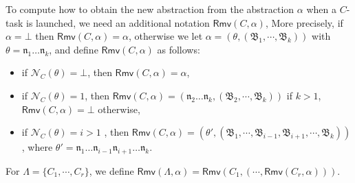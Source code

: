 \documentclass[preprint,12pt]{elsarticle}
\newcommand\act{{\sf Act}}
\newcommand\namefun{\mathcal{N}}
\newcommand\aname{\mathfrak{n}}
\newcommand{\STK}{\mathsf{STK}}
\newcommand{\SIT}{\mathsf{SIT}}
\newcommand\AutB{{\mathfrak{B} }}
\newcommand\Lang{{\mathscr{L} }}
\newcommand\rmv{\mathsf{Rmv}}
\begin{document}
{{\begin{minipage}{0.9\textwidth}
\begin{enumerate}
\end{enumerate}
\end{minipage}
}

To compute how to obtain the new abstraction from the abstraction $\alpha$ when a $C$-task is launched, we need an additional notation $\rmv(C,\alpha)$,
More precisely, if $\alpha = \bot$ then $\rmv(C,\alpha) = \alpha$, otherwise we let $\alpha = (\theta, (\AutB_1,\cdots, \AutB_k))$ with $\theta = \aname_1\dots\aname_k$, and define $\rmv(C,\alpha)$ as follows:
\begin{itemize}
    \item if $\namefun_C(\theta) = \bot$, then $\rmv(C,\alpha) = \alpha$,
    \item if $\namefun_C(\theta) = 1$, then $\rmv(C,\alpha) = (\aname_2\dots\aname_k,(\AutB_2,\cdots,\AutB_k))$ if $k>1$, $\rmv(C,\alpha) = \bot$ otherwise,
    \item if $\namefun_C(\theta) = i > 1$ , then $\rmv(C,\alpha) = (\theta',(\AutB_1,\cdots,\AutB_{i-1},\AutB_{i+1},\cdots,\AutB_{k}))$, where $\theta' = \aname_1\dots\aname_{i-1}\aname_{i+1}\dots\aname_k$.
\end{itemize}
For $\Lambda = \{C_1,\cdots,C_r\}$, we define $\rmv(\Lambda,\alpha) = \rmv(C_1,(\cdots,\rmv(C_r,\alpha)))$.

}
\end{document}
